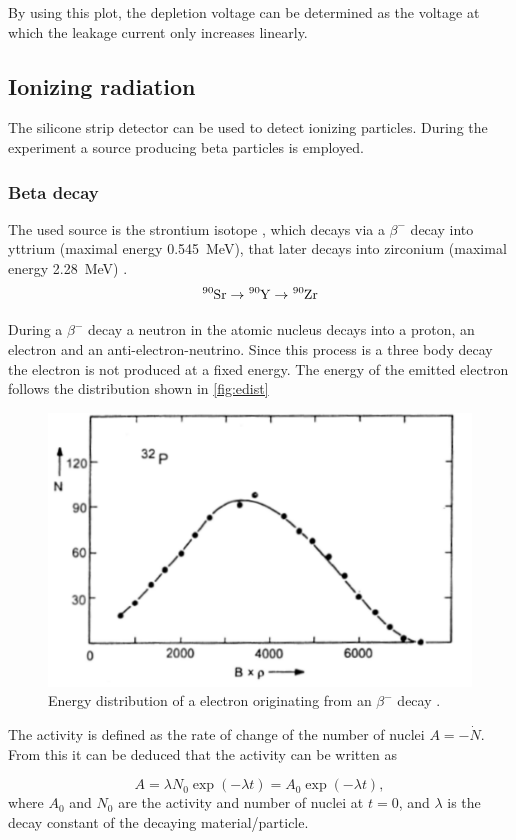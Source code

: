 By using this plot, the depletion voltage can be determined as the voltage at which the leakage current only increases linearly.

\subsection{Ionizing radiation}
The silicone strip detector can be used to detect ionizing particles. During the experiment a source producing beta particles is employed.
\subsubsection{Beta decay}
The used source is the strontium isotope , which decays via a $\beta^-$ decay into yttrium (maximal energy \qty{0.545}{\mega\eV}), that later decays into zirconium (maximal energy \qty{2.28}{\mega\eV}) \cite{V15}.
\begin{equation*}
	\ce{^{90}Sr} \rightarrow \ce{^{90}Y} \rightarrow \ce{^{90}Zr}
\end{equation*}

During a $\beta^-$ decay a neutron in the atomic nucleus decays into a proton, an electron and an anti-electron-neutrino. Since this process is a three body decay the electron is not produced at a fixed energy. The energy of the emitted electron follows the distribution shown in \autoref{fig:edist}


\begin{figure}[H]
	\centering
	\includegraphics[width=0.7\linewidth]{Assets/edist.png}
	\caption{Energy distribution of a electron originating from an $\beta^-$ decay \cite{V15}.}
	\label{fig:edist}
\end{figure}

The activity is defined as the rate of change of the number of nuclei $A = - \dot{N}$. From this it can be deduced that the activity can be written as

\begin{equation*}
	A = \lambda N_0 \exp(-\lambda t) = A_0 \exp(-\lambda t),
\end{equation*}
where $A_0$ and $N_0$ are the activity and number of nuclei at $t=0$, and $\lambda$ is the decay constant of the decaying material/particle.

